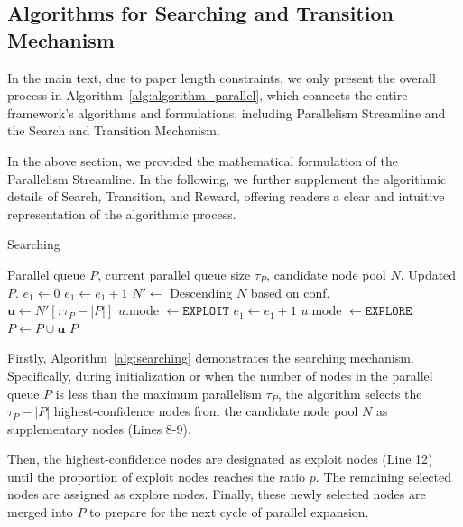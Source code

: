 \subsection{Algorithms for Searching and Transition Mechanism}
\label{sec:app:algorithms}

In the main text, due to paper length constraints, we only present the overall process in Algorithm~\ref{alg:algorithm_parallel}, which connects the entire framework’s algorithms and formulations, including Parallelism Streamline and the Search and Transition Mechanism.

In the above section, we provided the mathematical formulation of the Parallelism Streamline. In the following, we further supplement the algorithmic details of Search, Transition, and Reward, offering readers a clear and intuitive representation of the algorithmic process. 



\begin{algorithm}[ht]
    \caption{Searching}
\label{alg:searching}
\begin{algorithmic}[1]
\REQUIRE Parallel queue $P$, current parallel queue size $\tau_P$, candidate node pool $N$. 
\ENSURE Updated $P$. 
\STATE $e_1\gets 0$
    \STATE $e_1 \gets e_1  + 1$
    \ENDIF
\ENDFOR
{}
    \STATE $N'\gets$ Descending $N$ based on conf. \\
    \STATE $\mathbf{u} \gets N'[:\tau_P-|P|]$ 
        \STATE $u$.mode $\gets \mathtt{EXPLOIT}$
        \STATE $e_1 \gets e_1  + 1$
        \ELSE
        \STATE $u$.mode $\gets \mathtt{EXPLORE}$
        \ENDIF 
    \ENDFOR
    \STATE $P \gets P \cup \mathbf{u}$
\ENDIF
\RETURN $P$
\end{algorithmic}
\end{algorithm}

Firstly, Algorithm~\ref{alg:searching} demonstrates the searching mechanism. Specifically, during initialization or when the number of nodes in the parallel queue $P$ is less than the maximum parallelism $\tau_P$, the algorithm selects the $\tau_P- |P|$ highest-confidence nodes from the candidate node pool $N$ as supplementary nodes (Lines 8-9).

Then, the highest-confidence nodes are designated as exploit nodes (Line 12) until the proportion of exploit nodes reaches the ratio $p$. The remaining selected nodes are assigned as explore nodes. Finally, these newly selected nodes are merged into $P$ to prepare for the next cycle of parallel expansion. 

